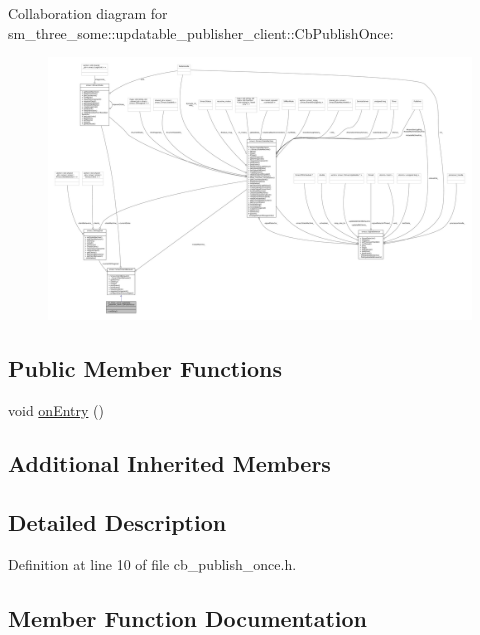 Collaboration diagram for sm\+\_\+three\+\_\+some\+:\+:updatable\+\_\+publisher\+\_\+client\+:\+:Cb\+Publish\+Once\+:
\nopagebreak
\begin{figure}[H]
\begin{center}
\leavevmode
\includegraphics[width=350pt]{classsm__three__some_1_1updatable__publisher__client_1_1CbPublishOnce__coll__graph}
\end{center}
\end{figure}
\subsection*{Public Member Functions}
\begin{DoxyCompactItemize}
\item 
void \hyperlink{classsm__three__some_1_1updatable__publisher__client_1_1CbPublishOnce_ae190346cee7e7ffb2fae66c28c2022ba}{on\+Entry} ()
\end{DoxyCompactItemize}
\subsection*{Additional Inherited Members}


\subsection{Detailed Description}


Definition at line 10 of file cb\+\_\+publish\+\_\+once.\+h.



\subsection{Member Function Documentation}
